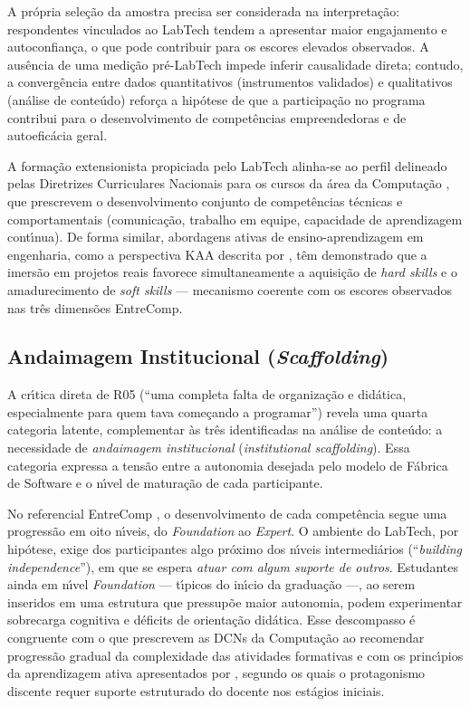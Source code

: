\documentclass[12pt,a4paper]{article}
\begin{document}
A pr\'opria sele\c{c}\~ao da amostra precisa ser considerada na
interpreta\c{c}\~ao: respondentes vinculados ao LabTech tendem a apresentar
maior engajamento e autoconfian\c{c}a, o que pode contribuir para os
escores elevados observados. A aus\^encia de uma medi\c{c}\~ao
pr\'e-LabTech impede inferir causalidade direta; contudo, a converg\^encia
entre dados quantitativos (instrumentos validados) e qualitativos
(an\'alise de conte\'udo) refor\c{c}a a hip\'otese de que a
participa\c{c}\~ao no programa contribui para o desenvolvimento de
compet\^encias empreendedoras e de autoefic\'acia geral.

A formação extensionista propiciada pelo LabTech alinha-se ao perfil
delineado pelas Diretrizes Curriculares Nacionais para os cursos da
\'area da Computa\c{c}\~ao \cite{dcncomputacao2016}, que prescrevem o
desenvolvimento conjunto de compet\^encias t\'ecnicas e comportamentais
(comunica\c{c}\~ao, trabalho em equipe, capacidade de aprendizagem
cont\'\i nua). De forma similar, abordagens ativas de ensino-aprendizagem
em engenharia, como a perspectiva KAA descrita por
, t\^em demonstrado que a imers\~ao em projetos reais
favorece simultaneamente a aquisi\c{c}\~ao de \emph{hard skills} e o
amadurecimento de \emph{soft skills} --- mecanismo coerente com os
escores observados nas tr\^es dimens\~oes EntreComp.

\subsection{Andaimagem Institucional (\emph{Scaffolding})}
\label{sec:scaffolding}

A cr\'\i tica direta de R05 (``uma completa falta de organiza\c{c}\~ao e
did\'atica, especialmente para quem tava come\c{c}ando a programar'')
revela uma quarta categoria latente, complementar \`as tr\^es identificadas
na an\'alise de conte\'udo: a necessidade de \emph{andaimagem institucional}
(\emph{institutional scaffolding}). Essa categoria expressa a tens\~ao
entre a autonomia desejada pelo modelo de F\'abrica de Software e o
n\'\i vel de matura\c{c}\~ao de cada participante.

No referencial EntreComp \cite{bacigalupo2016entrecomp}, o desenvolvimento
de cada compet\^encia segue uma progress\~ao em oito n\'\i veis, do
\emph{Foundation} ao \emph{Expert}. O ambiente do LabTech, por hip\'otese,
exige dos participantes algo pr\'oximo dos n\'\i veis intermedi\'arios
(``\emph{building independence}''), em que se espera \emph{atuar com
algum suporte de outros}. Estudantes ainda em n\'\i vel \emph{Foundation}
--- t\'\i picos do in\'\i cio da gradua\c{c}\~ao ---, ao serem inseridos
em uma estrutura que pressup\~oe maior autonomia, podem experimentar
sobrecarga cognitiva e d\'eficits de orienta\c{c}\~ao did\'atica. Esse
descompasso \'e congruente com o que prescrevem as DCNs da Computa\c{c}\~ao
\cite{dcncomputacao2016} ao recomendar progress\~ao gradual da
complexidade das atividades formativas e com os princ\'\i pios da
aprendizagem ativa apresentados por , segundo os quais
o protagonismo discente requer suporte estruturado do docente nos
est\'agios iniciais.
\end{document}

